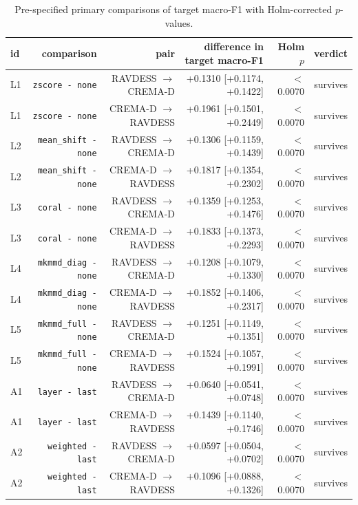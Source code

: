 \begin{table}[!t]
  \centering
  \caption{Pre-specified primary comparisons of target macro-F1 with Holm-corrected $p$-values.}
  \label{tab:primary}
  \begin{tabular}{lrrrrr}
    \toprule
    id & comparison & pair & difference in target macro-F1 & Holm $p$ & verdict \\
    \midrule
    L1 & \texttt{zscore - none} & RAVDESS $\rightarrow$ CREMA-D & +0.1310 [+0.1174, +0.1422] & $<$0.0070 & survives \\
    L1 & \texttt{zscore - none} & CREMA-D $\rightarrow$ RAVDESS & +0.1961 [+0.1501, +0.2449] & $<$0.0070 & survives \\
    L2 & \texttt{mean\_shift - none} & RAVDESS $\rightarrow$ CREMA-D & +0.1306 [+0.1159, +0.1439] & $<$0.0070 & survives \\
    L2 & \texttt{mean\_shift - none} & CREMA-D $\rightarrow$ RAVDESS & +0.1817 [+0.1354, +0.2302] & $<$0.0070 & survives \\
    L3 & \texttt{coral - none} & RAVDESS $\rightarrow$ CREMA-D & +0.1359 [+0.1253, +0.1476] & $<$0.0070 & survives \\
    L3 & \texttt{coral - none} & CREMA-D $\rightarrow$ RAVDESS & +0.1833 [+0.1373, +0.2293] & $<$0.0070 & survives \\
    L4 & \texttt{mkmmd\_diag - none} & RAVDESS $\rightarrow$ CREMA-D & +0.1208 [+0.1079, +0.1330] & $<$0.0070 & survives \\
    L4 & \texttt{mkmmd\_diag - none} & CREMA-D $\rightarrow$ RAVDESS & +0.1852 [+0.1406, +0.2317] & $<$0.0070 & survives \\
    L5 & \texttt{mkmmd\_full - none} & RAVDESS $\rightarrow$ CREMA-D & +0.1251 [+0.1149, +0.1351] & $<$0.0070 & survives \\
    L5 & \texttt{mkmmd\_full - none} & CREMA-D $\rightarrow$ RAVDESS & +0.1524 [+0.1057, +0.1991] & $<$0.0070 & survives \\
    A1 & \texttt{layer - last} & RAVDESS $\rightarrow$ CREMA-D & +0.0640 [+0.0541, +0.0748] & $<$0.0070 & survives \\
    A1 & \texttt{layer - last} & CREMA-D $\rightarrow$ RAVDESS & +0.1439 [+0.1140, +0.1746] & $<$0.0070 & survives \\
    A2 & \texttt{weighted - last} & RAVDESS $\rightarrow$ CREMA-D & +0.0597 [+0.0504, +0.0702] & $<$0.0070 & survives \\
    A2 & \texttt{weighted - last} & CREMA-D $\rightarrow$ RAVDESS & +0.1096 [+0.0888, +0.1326] & $<$0.0070 & survives \\
    \bottomrule
  \end{tabular}
\end{table}
